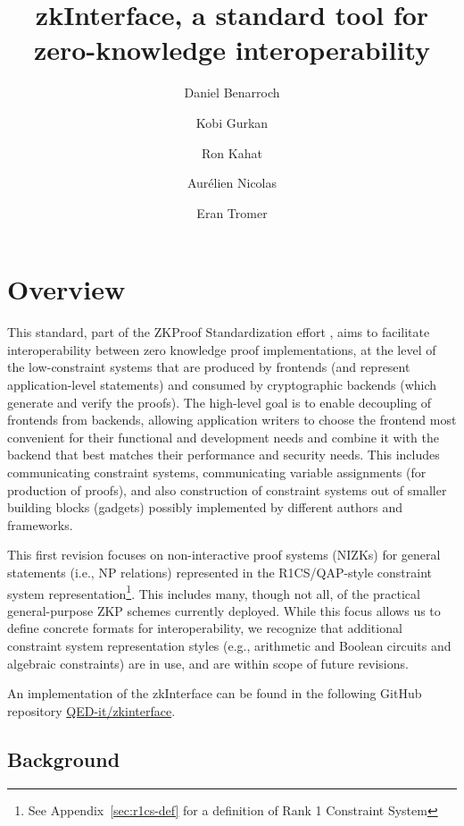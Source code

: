 \documentclass[a4paper,12pt]{article}
\title{zkInterface, a standard tool for zero-knowledge interoperability}
\author[1]{Daniel Benarroch}
\author[1]{Kobi Gurkan}
\author[1]{Ron Kahat}
\author[1]{Aurélien Nicolas}
\author[2]{Eran Tromer}
\affil[1]{QED-it}
\affil[2]{QED-it, Columbia University, Tel Aviv University}
\newcommand{\enote}[1]{\dtcolornote[Eran]{darkgreen}{#1}}
\begin{document}
\maketitle



\tableofcontents
\pagebreak
\section{Overview}
This standard, part of the ZKProof Standardization effort \cite{ZKProofSecurity, ZKProofImplementation, ZKProofApplications}, aims to facilitate interoperability between zero knowledge proof implementations, at the level of the low-constraint systems that are produced by frontends (and represent application-level statements) and consumed by cryptographic backends (which generate and verify the proofs). The high-level goal is to enable decoupling of frontends from backends, allowing application writers to choose the frontend most convenient for their functional and development needs and combine it with the backend that best matches their performance and security needs. This includes communicating constraint systems, communicating variable assignments (for production of proofs), and also construction of constraint systems out of smaller building blocks (gadgets) possibly implemented by different authors and frameworks.

This first revision focuses on non-interactive proof systems (NIZKs) for general statements (i.e., NP relations) represented in the R1CS/QAP-style constraint system representation\footnote{See Appendix~\ref{sec:r1cs-def} for a definition of Rank 1 Constraint System}. This includes many, though not all, of the practical general-purpose ZKP schemes currently deployed. While this focus allows us to define concrete formats for interoperability, we recognize that additional constraint system representation styles (e.g., arithmetic and Boolean circuits and algebraic constraints) are in use, and are within scope of future revisions.

An implementation of the zkInterface can be found in the following GitHub repository \href{https://github.com/QED-it/zkinterface}{QED-it/zkinterface}.
\subsection{Background}
\end{document}
